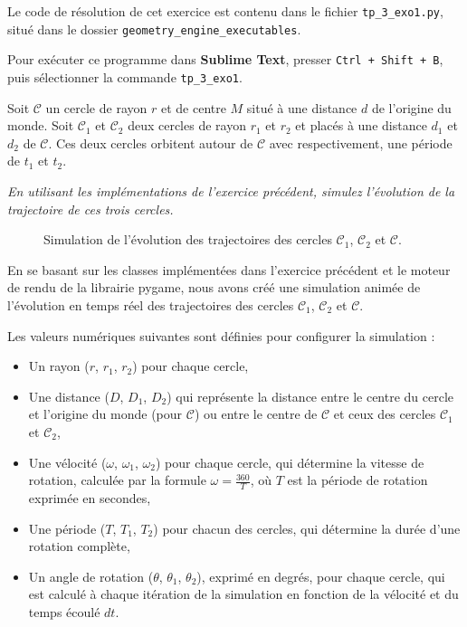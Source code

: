 \documentclass[a4paper,12pt]{article}
\begin{document}
Le code de résolution de cet exercice est contenu dans le fichier \texttt{tp\_3\_exo1.py}, situé dans le dossier \texttt{geometry\_engine\_executables}.

Pour exécuter ce programme dans \textbf{Sublime Text}, presser \texttt{Ctrl + Shift + B}, puis sélectionner la commande \texttt{tp\_3\_exo1}.

\newpage

\setlength{\parskip}{0.5em}
\setlength{\parindent}{0em}

Soit $\mathcal{C}$ un cercle de rayon $r$ et de centre $M$ situé à une distance $d$ de l'origine du monde. Soit $\mathcal{C}_1$ et $\mathcal{C}_2$ deux cercles de rayon $r_1$ et $r_2$ et placés à une distance $d_1$ et $d_2$ de $\mathcal{C}$. Ces deux cercles orbitent autour de $\mathcal{C}$ avec respectivement, une période de $t_1$ et $t_2$.

\vspace{0.5cm}

\emph{En utilisant les implémentations de l'exercice précédent, simulez l'évolution de la trajectoire de ces trois cercles.}

\begin{figure}[h]
    \centering
    \caption{Simulation de l'évolution des trajectoires des cercles $\mathcal{C}_1$, $\mathcal{C}_2$ et $\mathcal{C}$.}
    \label{fig:orbite}
\end{figure}

En se basant sur les classes implémentées dans l'exercice précédent et le moteur de rendu de la librairie pygame, 
nous avons créé une simulation animée de l'évolution en temps réel des trajectoires des cercles $\mathcal{C}_1$, $\mathcal{C}_2$ et $\mathcal{C}$.

Les valeurs numériques suivantes sont définies pour configurer la simulation :

\begin{itemize}
    \item Un rayon ($r$, $r_1$, $r_2$) pour chaque cercle,
    \item Une distance ($D$, $D_1$, $D_2$) qui représente la distance entre le centre du cercle et l'origine du monde (pour $\mathcal{C}$) ou entre le centre de $\mathcal{C}$ et ceux des cercles $\mathcal{C}_1$ et $\mathcal{C}_2$,
    \item Une vélocité ($\omega$, $\omega_1$, $\omega_2$) pour chaque cercle, qui détermine la vitesse de rotation, calculée par la formule $\omega = \frac{360}{T}$, où $T$ est la période de rotation exprimée en secondes,
    \item Une période ($T$, $T_1$, $T_2$) pour chacun des cercles, qui détermine la durée d'une rotation complète,
    \item Un angle de rotation ($\theta$, $\theta_1$, $\theta_2$), exprimé en degrés, pour chaque cercle, qui est calculé à chaque itération de la simulation en fonction de la vélocité et du temps écoulé $dt$.
\end{itemize}
\end{document}
